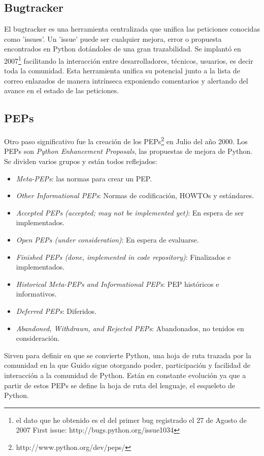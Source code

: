 \documentclass[11pt]{scrartcl}
\begin{document}
\subsection{Bugtracker}\label{sec:bugtracker}

El bugtracker es una herramienta centralizada que unifica las peticiones conocidas como 'issues'. Un 'issue' puede ser cualquier mejora, error o propuesta encontrados en Python dotándoles de una gran trazabilidad. Se implantó en 2007\footnote{el dato que he obtenido es el del primer bug registrado el 27 de Agosto de 2007 First issue: http://bugs.python.org/issue1034} facilitando la interacción entre desarrolladores, técnicos, usuarios, es decir toda la comunidad. Esta herramienta unifica su potencial junto a la lista de correo enlazados de manera intrínseca exponiendo comentarios y alertando del avance en el estado de las peticiones.

\subsection{PEPs}\label{sec:peps}

Otro paso significativo fue la creación de los PEPs\footnote{http://www.python.org/dev/peps/} en Julio del año 2000. Los PEPs son \emph{Python Enhancement Proposals}, las propuestas de mejora de Python. Se dividen varios grupos y están todos reflejados:

\begin{itemize}
    \item \emph{Meta-PEPs}: las normas para crear un PEP.
    \item \emph{Other Informational PEPs}: Normas de codificación, HOWTOs y estándares.
    \item \emph{Accepted PEPs (accepted; may not be implemented yet)}: En espera de ser implementados.
    \item \emph{Open PEPs (under consideration)}: En espera de evaluarse.
    \item \emph{Finished PEPs (done, implemented in code repository)}: Finalizados e implementados.
    \item \emph{Historical Meta-PEPs and Informational PEPs}: PEP históricos e informativos.
    \item \emph{Deferred PEPs}: Diferidos.
    \item \emph{Abandoned, Withdrawn, and Rejected PEPs}: Abandonados, no tenidos en consideración.
\end{itemize}

Sirven para definir en que se convierte Python, una hoja de ruta trazada por la comunidad en la que Guido sigue otorgando poder, participación y facilidad de interacción a la comunidad de Python. Están en constante evolución ya que a partir de estos PEPs se define la hoja de ruta del lenguaje, el esqueleto de Python.
\end{document}

